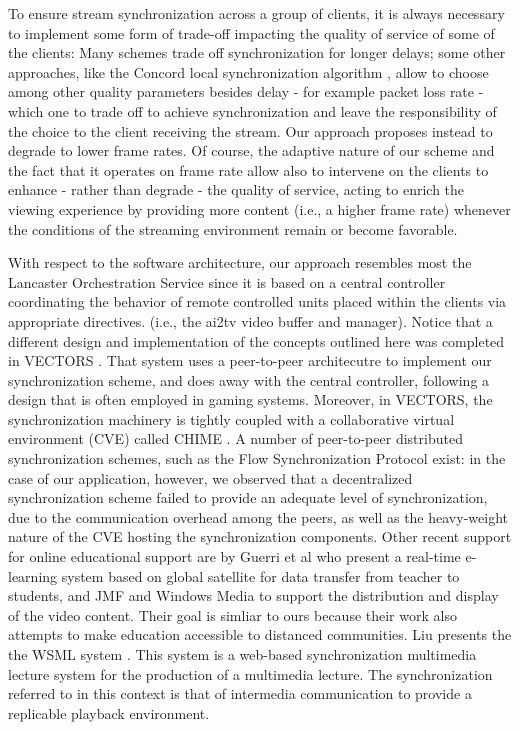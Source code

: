 \documentclass{sig-alternate}
\begin{document}
To ensure stream synchronization across a group of clients, 
it is always necessary to implement some form of trade-off impacting the quality of service of
some of the clients:
Many schemes trade off synchronization for longer delays;
some other approaches, like the Concord local synchronization algorithm \cite{Concord},
allow to choose among other quality parameters besides delay - for example packet loss rate - 
which one to trade off to achieve synchronization
and leave the responsibility of the choice to the client receiving the stream.
Our approach proposes instead to  degrade to lower frame rates. 
Of course, the adaptive nature of our scheme and the fact that it operates on frame rate allow
also to intervene on the clients to enhance - rather than degrade - the quality of service,
acting to enrich the viewing experience by providing more content (i.e., a higher frame rate)
whenever the conditions of the streaming environment remain or become favorable.

With respect to the software architecture, our approach resembles most the 
Lancaster Orchestration Service \cite{Lancaster}
since it is based on a central controller coordinating the behavior 
of remote controlled units placed within the clients via appropriate directives.
(i.e., the ai2tv video buffer and manager).
Notice that a different design and implementation of the concepts outlined here was
completed in VECTORS \cite{VECTORS}.  That system uses a peer-to-peer
architecutre to implement our synchronization scheme, and does away with 
the central controller, following a design that is often employed in gaming systems.
Moreover, in VECTORS, the synchronization machinery is tightly 
coupled with a collaborative virtual environment (CVE)
called CHIME \cite{CHIME}.
A number of peer-to-peer distributed synchronization schemes, 
such as the Flow Synchronization Protocol \cite{FSP}  
exist: in the case of our application, however, 
we observed that a decentralized synchronization
scheme failed to provide an adequate level of
synchronization, 
due to the communication overhead among the peers, 
as well as the heavy-weight nature of the CVE hosting the synchronization components.
%
%
%
Other recent support for online educational support are by Guerri et
al who present a real-time e-learning system based on global satellite
for data transfer from teacher to students, and JMF and Windows Media
\cite{GUERRI} to support the distribution and display of the video
content.  Their goal is simliar to ours because their work also
attempts to make education accessible to distanced communities.  Liu
presents the the WSML system \cite{LIU2}.  This system is a web-based
synchronization multimedia lecture system for the production of a
multimedia lecture.  The synchronization referred to in this context
is that of intermedia communication to provide a replicable playback
environment.
\end{document}
